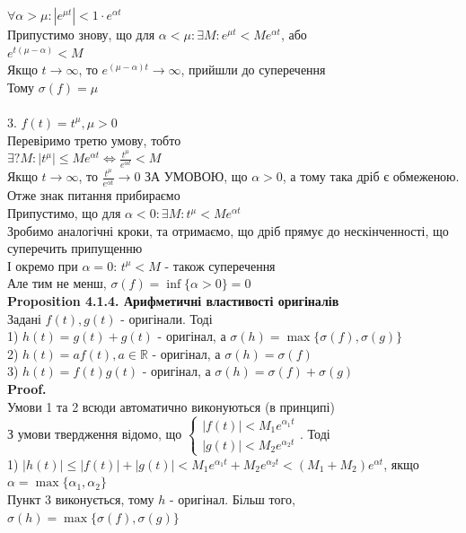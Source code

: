 \documentclass[a4paper, 14pt]{extarticle}
\def\hugespace{\vspace{5mm} \\}
\begin{document}
$\forall \alpha > \mu: |e^{\mu t}| < 1\cdot e^{\alpha t}$\\
Припустимо знову, що для $\alpha < \mu: \exists M: e^{\mu t} < M e^{\alpha t}$, або\\
$e^{t(\mu - \alpha)} < M$\\
Якщо $t \to \infty$, то $e^{(\mu-\alpha)t} \to \infty$, прийшли до суперечення\\
Тому $\sigma(f) = \mu$\\
\\
3. $f(t) = t^{\mu}, \mu>0$\\
Перевіримо третю умову, тобто\\
$\displaystyle \exists? M: |t^{\mu}| \leq Me^{\alpha t} \iff \frac{t^{\mu}}{e^{\alpha t}} < M$\\
Якщо $t \to \infty$, то $\displaystyle \frac{t^{\mu}}{e^{\alpha t}} \to 0$ ЗА УМОВОЮ, що $\alpha > 0$, а тому така дріб є обмеженою. Отже знак питання прибираємо\\
Припустимо, що для $\alpha<0: \exists M: t^{\mu} < Me^{\alpha t}$\\
Зробимо аналогічні кроки, та отримаємо, що дріб прямує до нескінченності, що суперечить припущенню\\
І окремо при $\alpha = 0$: $t^{\mu} < M$ - також суперечення\\
Але тим не менш, $\sigma(f) = \inf\{\alpha > 0\} = 0$
\hugespace
\textbf{Proposition 4.1.4. Арифметичні властивості оригіналів}\\
Задані $f(t), g(t)$ - оригінали. Тоді\\
1) $h(t) = g(t)+g(t)$ - оригінал, а $\sigma(h)=\max\{\sigma(f),\sigma(g)\}$\\
2) $h(t) = af(t), a \in \mathbb{R}$ - оригінал, а $\sigma(h)=\sigma(f)$\\
3) $h(t) = f(t) g(t)$ - оригінал, а $\sigma(h)= \sigma(f) + \sigma(g)$\\
\textbf{Proof.}\\
Умови 1 та 2 всюди автоматично виконуються (в принципі)\\
З умови твердження відомо, що $\begin{cases} |f(t)| < M_1 e^{\alpha_1 t} \\ |g(t)| < M_2 e^{\alpha_2 t} \end{cases}$. Тоді\\
1) $|h(t)| \leq |f(t)| + |g(t)| < M_1 e^{\alpha_1 t} + M_2 e^{\alpha_2 t} < (M_1+M_2)e^{\alpha t}$, якщо $\alpha = \max\{\alpha_1, \alpha_2\}$\\
Пункт 3 виконується, тому $h$ - оригінал. Більш того, $\sigma(h) = \max\{\sigma(f),\sigma(g)\}$\hugespace
\end{document}
